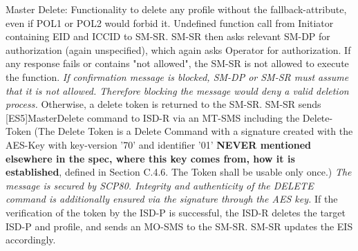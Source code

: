Master Delete: Functionality to delete any profile without the fallback-attribute, even if POL1 or POL2 would forbid it.
Undefined function call from Initiator containing EID and ICCID to SM-SR. SM-SR then asks relevant SM-DP for authorization (again unspecified), which again asks Operator for authorization. If any response fails or contains "not allowed", the SM-SR is not allowed to execute the function. \textit{If confirmation message is blocked, SM-DP or SM-SR must assume that it is not allowed. Therefore blocking the message would deny a valid deletion process.} Otherwise, a delete token is returned to the SM-SR. SM-SR sends [ES5]MasterDelete command to ISD-R via an MT-SMS including the Delete-Token (The Delete Token is a Delete Command with a signature created with the AES-Key with key-version '70' and identifier '01' \textbf{NEVER mentioned elsewhere in the spec, where this key comes from, how it is established}, defined in \parencite{GPC:CardSpec} Section C.4.6. The Token shall be usable only once.) \textit{The message is secured by SCP80. Integrity and authenticity of the DELETE command is additionally ensured via the signature through the AES key.} If the verification of the token by the ISD-P is successful, the ISD-R deletes the target ISD-P and profile, and sends an MO-SMS to the SM-SR. SM-SR updates the EIS accordingly.


